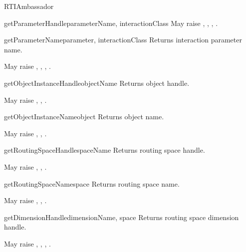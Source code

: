 \begin{classdesc}{RTIAmbassador}{}
\begin{methoddesc}{getParameterHandle}{parameterName, interactionClass}
May raise
,
,
,
.
\end{methoddesc}

\begin{methoddesc}{getParameterName}{parameter, interactionClass}
Returns interaction parameter name.

May raise
,
,
,
.
\end{methoddesc}

\begin{methoddesc}{getObjectInstanceHandle}{objectName}
Returns object handle.

May raise
,
,
.
\end{methoddesc}

\begin{methoddesc}{getObjectInstanceName}{object}
Returns object name.

May raise
,
,
.
\end{methoddesc}

\begin{methoddesc}{getRoutingSpaceHandle}{spaceName}
Returns routing space handle.

May raise
,
,
.
\end{methoddesc}

\begin{methoddesc}{getRoutingSpaceName}{space}
Returns routing space name.

May raise
,
,
.
\end{methoddesc}

\begin{methoddesc}{getDimensionHandle}{dimensionName, space}
Returns routing space dimension handle.

May raise
,
,
,
.
\end{methoddesc}


\end{classdesc}
